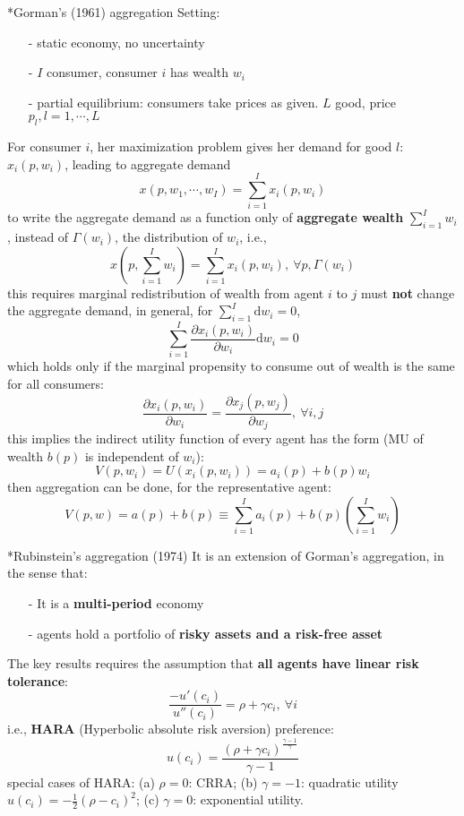 \documentclass[10pt,landscape,a4paper]{article}
\makeatletter
\renewcommand{\subsubsection}{\@startsection{subsubsection}{1}{0mm}{.2ex}{.2ex}{\bfseries}}
\makeatother
\begin{document}
\begin{multicols*}{3}
\subsubsection*{Gorman's (1961) aggregation}
Setting:
\begin{itemize}
    \item[-] static economy, no uncertainty
    \item[-] $I$ consumer, consumer $i$ has wealth $w_i$
    \item[-] partial equilibrium: consumers take prices as given. $L$ good, price $p_l,l=1,\cdots,L$
\end{itemize}
For consumer $i$, her maximization problem gives her demand for good $l$: $x_i(p,w_i)$, leading to aggregate demand
$$
x(p,w_1,\cdots,w_I)=\sum^I_{i=1}x_i(p,w_i)
$$
to write the aggregate demand as a function only of \textbf{aggregate wealth} $\sum^I_{i=1}w_i$, instead of $\Gamma(w_i)$, the distribution of $w_i$, i.e.,
$$
x\left(p,\sum^I_{i=1}w_i\right)=\sum^I_{i=1}x_i(p,w_i),\ \forall p,\Gamma(w_i)
$$
this requires marginal redistribution of wealth from agent $i$ to $j$ must \textbf{not} change the aggregate demand, in general, for $\sum^I_{i=1}\mathrm{d}w_i=0$, 
$$
\sum^I_{i=1}\frac{\partial x_i(p,w_i)}{\partial w_i}\mathrm{d}w_i = 0
$$
which holds only if the marginal propensity to consume out of wealth is the same for all consumers:
$$
\frac{\partial x_i(p,w_i)}{\partial w_i} = \frac{\partial x_j(p,w_j)}{\partial w_j},\ \forall i,j
$$
this implies the indirect utility function of every agent has the form (MU of wealth $b(p)$ is independent of $w_i$):
$$
V(p,w_i)=U\left(x_i(p,w_i)\right) = a_i(p)+b(p)w_i
$$
then aggregation can be done, for the representative agent:
$$
V(p,w) = a(p)+b(p) \equiv \sum^I_{i=1}a_i(p) + b(p)\left(\sum^I_{i=1}w_i\right)
$$

\subsubsection*{Rubinstein's aggregation (1974)}
It is an extension of Gorman's aggregation, in the sense that:
\begin{itemize}
    \item[-] It is a \textbf{\color{myred}multi-period} economy
    \item[-] agents hold a portfolio of \textbf{\color{myred}risky assets and a risk-free asset}
\end{itemize}
The key results requires the assumption that \textbf{all agents have {\color{myred}linear risk tolerance}}:
$$
\frac{-u'(c_i)}{u''(c_i)}=\rho+\gamma c_i,\ \forall i
$$
i.e., \textbf{\color{myred}HARA} (Hyperbolic absolute risk aversion) preference:
$$
u(c_i)=\frac{(\rho+\gamma c_i)^{\frac{\gamma-1}{\gamma}}}{\gamma-1}
$$
special cases of HARA: (a) $\rho=0$: CRRA; (b) $\gamma=-1$: quadratic utility $u(c_i)=-\frac{1}{2}\left(\rho-c_i\right)^2$; (c) $\gamma=0$: exponential utility.


\end{multicols*}
\end{document}
